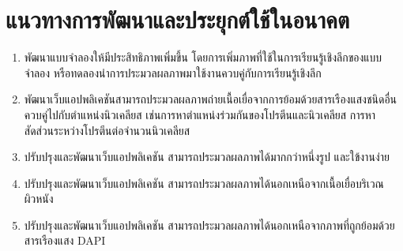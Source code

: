 \documentclass[12pt,oneside,openright,a4paper]{cpe-thai-project}
\begin{document}
\section{แนวทางการพัฒนาและประยุกต์ใช้ในอนาคต}
\begin{enumerate}
    \item พัฒนาแบบจำลองให้มีประสิทธิภาพเพิ่มขึ้น โดยการเพิ่มภาพที่ใช้ในการเรียนรู้เชิงลึกของแบบจำลอง หรือทดลองนำการประมวลผลภาพมาใช้งานควบคู่กับการเรียนรู้เชิงลึก
    \item พัฒนาเว็บแอปพลิเคชันสามารถประมวลผลภาพถ่ายเนื้อเยื่อจากการย้อมด้วยสารเรืองแสงชนิดอื่นควบคู่ไปกับตำแหน่งนิวเคลียส เช่นการหาตำแหน่งร่วมกันของโปรตีนและนิวเคลียส การหาสัดส่วนระหว่างโปรตีนต่อจำนวนนิวเคลียส
    \item ปรับปรุงและพัฒนาเว็บแอปพลิเคชัน สามารถประมวลผลภาพได้มากกว่าหนึ่งรูป และใข้งานง่าย    
    \item ปรับปรุงและพัฒนาเว็บแอปพลิเคชัน สามารถประมวลผลภาพได้นอกเหนือจากเนื้อเยื่อบริเวณผิวหนัง 
    \item ปรับปรุงและพัฒนาเว็บแอปพลิเคชัน สามารถประมวลผลภาพได้นอกเหนือจากภาพที่ถูกย้อมด้วยสารเรืองแสง DAPI  
\end{enumerate}
\end{document}
